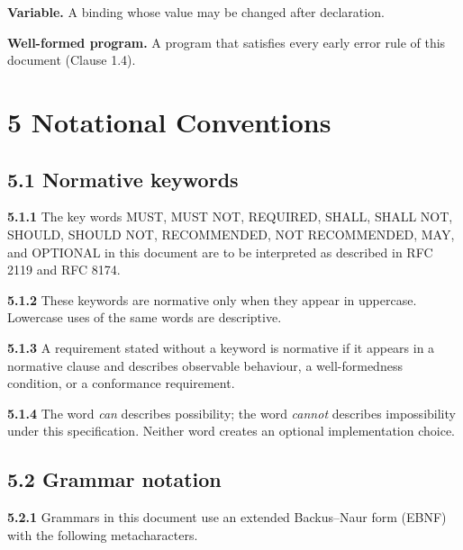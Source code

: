 \documentclass[
  english,
  11pt,
  a4paper,
]{article}
\begin{document}
\textbf{Variable.} A binding whose value may be changed after
declaration.

\textbf{Well-formed program.} A program that satisfies every early error
rule of this document (Clause 1.4).

\section{5 Notational Conventions}\label{notational-conventions}

\subsection{5.1 Normative keywords}\label{normative-keywords}

\textbf{5.1.1} The key words MUST, MUST NOT, REQUIRED, SHALL, SHALL NOT,
SHOULD, SHOULD NOT, RECOMMENDED, NOT RECOMMENDED, MAY, and OPTIONAL in
this document are to be interpreted as described in RFC 2119 and RFC
8174.

\textbf{5.1.2} These keywords are normative only when they appear in
uppercase. Lowercase uses of the same words are descriptive.

\textbf{5.1.3} A requirement stated without a keyword is normative if it
appears in a normative clause and describes observable behaviour, a
well-formedness condition, or a conformance requirement.

\textbf{5.1.4} The word \emph{can} describes possibility; the word
\emph{cannot} describes impossibility under this specification. Neither
word creates an optional implementation choice.

\subsection{5.2 Grammar notation}\label{grammar-notation}

\textbf{5.2.1} Grammars in this document use an extended Backus--Naur
form (EBNF) with the following metacharacters.
\end{document}

